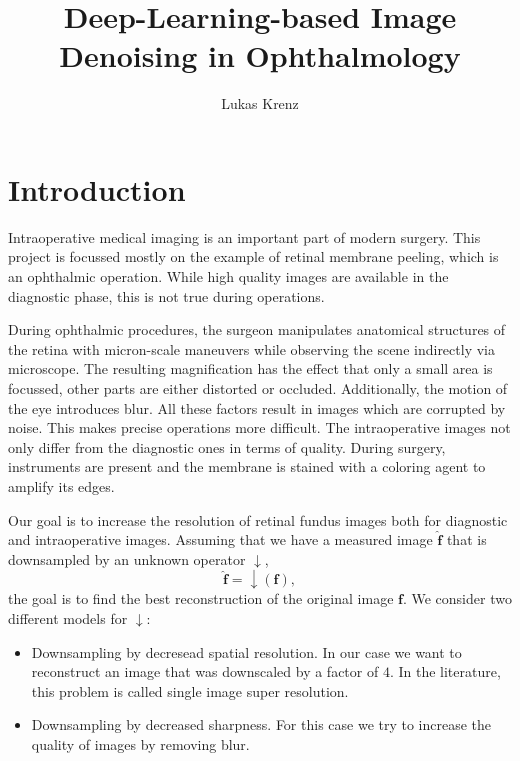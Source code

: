 \documentclass{scrartcl}
\newcommand{\img}{\bm{f}} %
\begin{document}
\title{Deep-Learning-based Image Denoising in Ophthalmology}
\author{Lukas Krenz}

\maketitle

\section{Introduction}
Intraoperative medical imaging is an important part of modern surgery.
This project is focussed mostly on the example of retinal membrane peeling, which is an ophthalmic operation.
While high quality images are available in the diagnostic phase, this is not true during operations.

During ophthalmic procedures, the surgeon manipulates anatomical structures of the retina with micron-scale maneuvers while observing the scene indirectly via microscope.
The resulting magnification has the effect that only a small area is focussed, other parts are either distorted or occluded.
Additionally, the motion of the eye introduces blur.
All these factors result in images which are corrupted by noise.
This makes precise operations more difficult.
The intraoperative images not only differ from the diagnostic ones in terms of quality.
During surgery, instruments are present and the membrane is stained with a coloring agent to amplify its edges.

Our goal is to increase the resolution of retinal fundus images both for diagnostic and intraoperative images.
Assuming that we have a measured image \(\hat{\img}\) that is downsampled by an unknown operator \(\operatorname{\downarrow}\),
\begin{equation}
  \label{eq:model}
  \hat{\img} = \operatorname{\downarrow}(\img),
\end{equation}
the goal is to find the best reconstruction of the original image \(\img\).
We consider two different models for \(\operatorname{\downarrow}\):
\begin{itemize}
\item Downsampling by decresead spatial resolution.
  In our case we want to reconstruct an image that was downscaled by a factor of $4$.
  In the literature, this problem is called single image super resolution.
\item Downsampling by decreased sharpness.
  For this case we try to increase the quality of images by removing blur.
\end{itemize}
\end{document}
